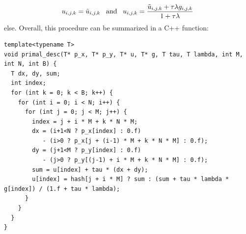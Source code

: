 \documentclass[abstracton]{scrreprt}
\begin{document}
            $$
                u_{i,j,k} = \tilde{u}_{i,j,k} \,\,\,\,\, \textnormal{and} \,\,\,\,\, u_{i,j,k} = \frac{\tilde{u}_{i,j,k} + \tau \lambda g_{i,j,k}}{1 + \tau\lambda}
            $$
        else. Overall, this procedure can be summarized in a C++ function:
        \begin{lstlisting}
template<typename T>
void primal_desc(T* p_x, T* p_y, T* u, T* g, T tau, T lambda, int M, int N, int B) {
  T dx, dy, sum;
  int index;
  for (int k = 0; k < B; k++) {
    for (int i = 0; i < N; i++) {
      for (int j = 0; j < M; j++) {
        index = j + i * M + k * N * M;
        dx = (i+1<N ? p_x[index] : 0.f)
           - (i>0 ? p_x[j + (i-1) * M + k * N * M] : 0.f);
        dy = (j+1<M ? p_y[index] : 0.f)
           - (j>0 ? p_y[(j-1) + i * M + k * N * M] : 0.f);
        sum = u[index] + tau * (dx + dy);
        u[index] = hash[j + i * M] ? sum : (sum + tau * lambda * g[index]) / (1.f + tau * lambda);
      }
    }
  }
}
        \end{lstlisting}
\end{document}
